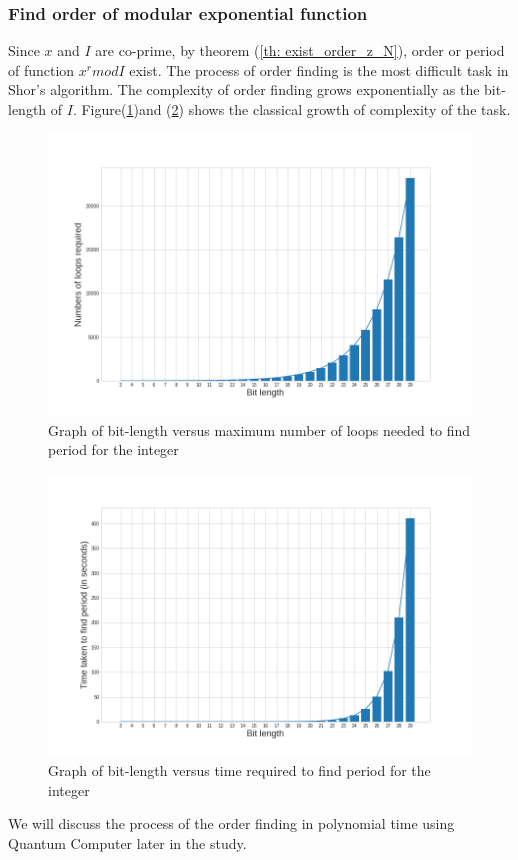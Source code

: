 \subsubsection{Find order of modular exponential function}
    Since $x$ and $I$ are co-prime, by theorem (\ref{th: exist_order_z_N}), order or period of function $x^r mod I$ exist. The process of order finding is the most difficult task in Shor’s algorithm. The complexity of order finding grows exponentially as the bit-length of $I$. Figure(\ref{fig: period_finding_complexity})and (\ref{fig: period_finding_complexity_time}) shows the classical growth of complexity of the task.
    \begin{figure}[ht]
    \centering
    \includegraphics[width=\linewidth]{figures/nuum_loops_vs_bits.png}
    \caption{Graph of bit-length versus maximum number of loops needed to find period for the integer}
    \label{fig: period_finding_complexity}
    \end{figure}
     \begin{figure}[ht]
    \centering
    \includegraphics[width=\linewidth]{figures/time_period_vs_bits.png}
    \caption{Graph of bit-length versus time required to find period for the integer}
    \label{fig: period_finding_complexity_time}
    \end{figure}
We will discuss the process of the order finding in polynomial time using Quantum Computer later in the study.
